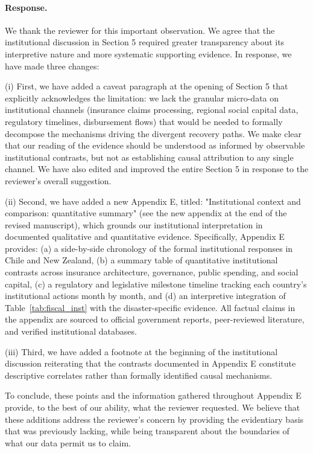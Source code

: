 \paragraph{Response.} We thank the reviewer for this important observation. We agree that the institutional discussion in Section 5 required greater transparency about its interpretive nature and more systematic supporting evidence.
In response, we have made three changes:

(i) First, we have added a caveat paragraph at the opening of Section 5 that explicitly acknowledges the limitation: we lack the granular micro-data on institutional channels (insurance claims processing, regional social capital data, regulatory timelines, disbursement flows) that would be needed to formally decompose the mechanisms driving the divergent recovery paths. We make clear that our reading of the evidence should be understood as informed by observable institutional contrasts, but not as establishing causal attribution to any single channel. We have also edited and improved the entire Section 5 in response to the reviewer's overall suggestion.

(ii) Second, we have added a new Appendix E, titled: "Institutional context and comparison: quantitative summary" (see the new appendix at the end of the revised manuscript), which grounds our institutional interpretation in documented qualitative and quantitative evidence. Specifically, Appendix E provides: (a) a side-by-side chronology of the formal institutional responses in Chile and New Zealand, (b) a summary table of quantitative institutional contrasts across insurance architecture, governance, public spending, and social capital, (c) a regulatory and legislative milestone timeline tracking each country's institutional actions month by month, and (d) an interpretive integration of Table~\ref{tab:fiscal_inst} with the disaster-specific evidence. All factual claims in the appendix are sourced to official government reports, peer-reviewed literature, and verified institutional databases.

(iii) Third, we have added a footnote at the beginning of the institutional discussion reiterating that the contrasts documented in Appendix E constitute descriptive correlates rather than formally identified causal mechanisms.

To conclude, these points and the information gathered throughout Appendix E provide, to the best of our ability, what the reviewer requested. We believe that these additions address the reviewer's concern by providing the evidentiary basis that was previously lacking, while being transparent about the boundaries of what our data permit us to claim.

